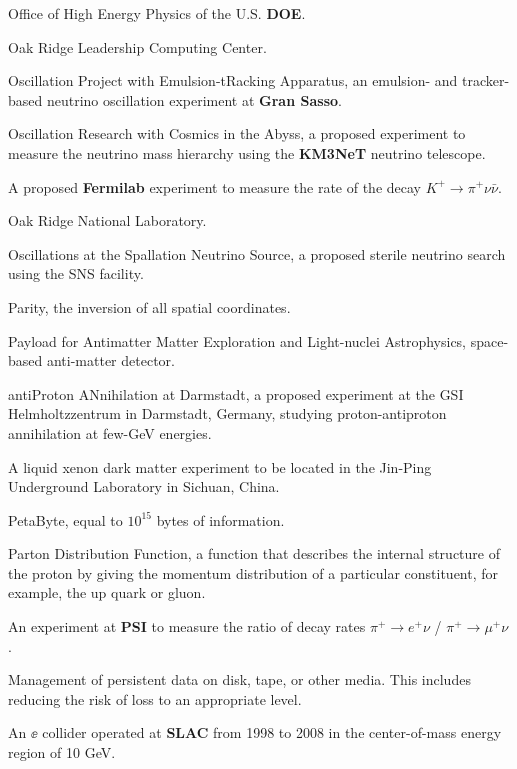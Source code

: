  Office of High Energy Physics of the U.S. {\bf DOE}. 


  Oak Ridge Leadership Computing Center.

 Oscillation Project with Emulsion-tRacking Apparatus, an 
emulsion- and tracker-based neutrino oscillation experiment at {\bf Gran
Sasso}.

 Oscillation Research with Cosmics in the Abyss,  a
proposed experiment to measure the neutrino mass hierarchy using the
{\bf KM3NeT} neutrino telescope.

 A proposed {\bf Fermilab} experiment to measure the rate
of the decay $K^+ \to \pi^+\nu\bar \nu$. 

 Oak Ridge National Laboratory.

 Oscillations at the Spallation Neutrino Source, a proposed
sterile neutrino search using the SNS facility.

 Parity, the inversion of all spatial coordinates.

  Payload for Antimatter Matter Exploration and Light-nuclei
Astrophysics, space-based anti-matter detector.

  antiProton ANnihilation at Darmstadt, a
proposed  experiment
at the GSI Helmholtzzentrum in Darmstadt, Germany, studying
proton-antiproton
annihilation at few-GeV energies.

  A liquid xenon dark matter experiment to be
located
in the Jin-Ping Underground Laboratory in Sichuan, China.


  PetaByte, equal to $10^{15}$ bytes of information.

 Parton Distribution Function, a function that describes the
internal structure of the proton by giving the momentum distribution of a
particular constituent, for example, the up quark or gluon.

  An experiment at {\bf PSI} to measure the ratio
of  decay rates  $\pi^+\to e^+\nu$ / $\pi^+ \to \mu^+ \nu$. 


  Management of  persistent data on disk, tape, or other
media. This includes reducing the risk of loss to an appropriate  level.


 An $\ee$ collider operated at {\bf SLAC} from 1998
to 2008 in the center-of-mass energy region of 10 GeV. 


